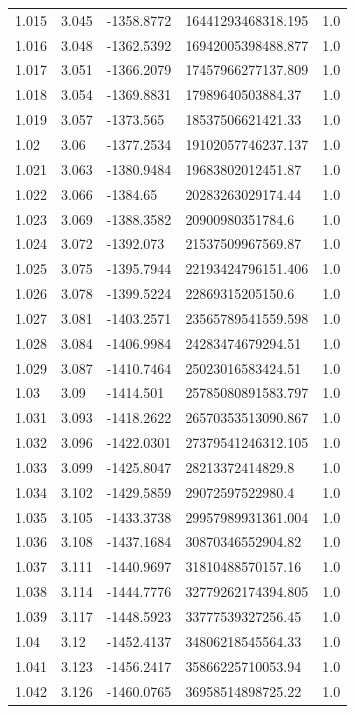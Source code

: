 \begin{tabular}{lllll}
1.015 & 3.045 & -1358.8772 & 16441293468318.195 & 1.0 \\
1.016 & 3.048 & -1362.5392 & 16942005398488.877 & 1.0 \\
1.017 & 3.051 & -1366.2079 & 17457966277137.809 & 1.0 \\
1.018 & 3.054 & -1369.8831 & 17989640503884.37 & 1.0 \\
1.019 & 3.057 & -1373.565 & 18537506621421.33 & 1.0 \\
1.02 & 3.06 & -1377.2534 & 19102057746237.137 & 1.0 \\
1.021 & 3.063 & -1380.9484 & 19683802012451.87 & 1.0 \\
1.022 & 3.066 & -1384.65 & 20283263029174.44 & 1.0 \\
1.023 & 3.069 & -1388.3582 & 20900980351784.6 & 1.0 \\
1.024 & 3.072 & -1392.073 & 21537509967569.87 & 1.0 \\
1.025 & 3.075 & -1395.7944 & 22193424796151.406 & 1.0 \\
1.026 & 3.078 & -1399.5224 & 22869315205150.6 & 1.0 \\
1.027 & 3.081 & -1403.2571 & 23565789541559.598 & 1.0 \\
1.028 & 3.084 & -1406.9984 & 24283474679294.51 & 1.0 \\
1.029 & 3.087 & -1410.7464 & 25023016583424.51 & 1.0 \\
1.03 & 3.09 & -1414.501 & 25785080891583.797 & 1.0 \\
1.031 & 3.093 & -1418.2622 & 26570353513090.867 & 1.0 \\
1.032 & 3.096 & -1422.0301 & 27379541246312.105 & 1.0 \\
1.033 & 3.099 & -1425.8047 & 28213372414829.8 & 1.0 \\
1.034 & 3.102 & -1429.5859 & 29072597522980.4 & 1.0 \\
1.035 & 3.105 & -1433.3738 & 29957989931361.004 & 1.0 \\
1.036 & 3.108 & -1437.1684 & 30870346552904.82 & 1.0 \\
1.037 & 3.111 & -1440.9697 & 31810488570157.16 & 1.0 \\
1.038 & 3.114 & -1444.7776 & 32779262174394.805 & 1.0 \\
1.039 & 3.117 & -1448.5923 & 33777539327256.45 & 1.0 \\
1.04 & 3.12 & -1452.4137 & 34806218545564.33 & 1.0 \\
1.041 & 3.123 & -1456.2417 & 35866225710053.94 & 1.0 \\
1.042 & 3.126 & -1460.0765 & 36958514898725.22 & 1.0 \\

\end{tabular}

